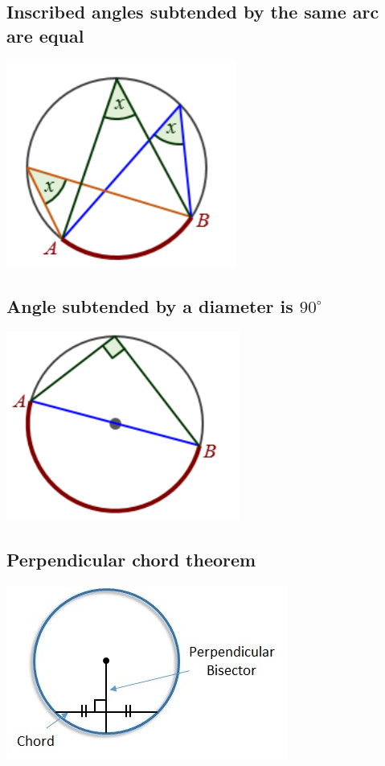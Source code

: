 \documentclass{article}
\begin{document}
\pagebreak

\subsection{Inscribed angles subtended by the same arc are equal}

\includegraphics{Picture3.png}

\vspace{40px}

\subsection{Angle subtended by a diameter is \(90^{\circ}\)}

\includegraphics{Picture4.png}

\pagebreak

\subsection{Perpendicular chord theorem}

\includegraphics{Picture5.jpg}
\end{document}
